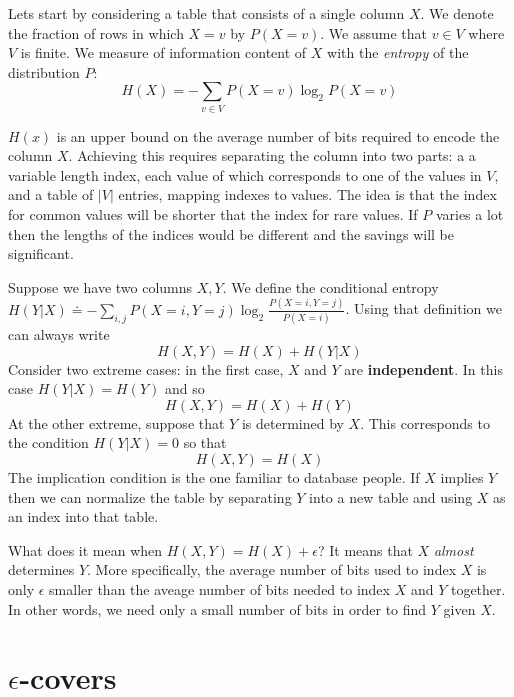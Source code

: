 \documentclass[11pt]{article}
\begin{document}
Lets start by considering a table that consists of a single column
$X$. We denote the fraction of rows in which $X=v$ by $P(X=v)$. We
assume that $v \in V$ where $V$ is finite.  We measure of information
content of $X$ with the {\em entropy} of the distribution $P$:
\[
H(X)=-\sum_{v \in V} P(X=v) \log_2 P(X=v)
\]

$H(x)$ is an upper bound on the average number of bits required to
encode the column $X$. Achieving this requires separating the column
into two parts: a a variable length index, each value of which
corresponds to one of the values in $V$, and a table of $|V|$ entries,
mapping indexes to values. The idea is that the index for common
values will be shorter that the index for rare values. If $P$ varies a
lot then the lengths of the indices would be different and the savings
will be significant.

Suppose we have two columns
$X,Y$. We define the conditional entropy $H(Y|X) \doteq -\sum_{i,j}
P(X=i,Y=j) \log_2  \frac{P(X=i,Y=j)}{P(X=i)}$. Using that definition we
can always write
\[
H(X,Y) = H(X)+H(Y|X)
\]
Consider two extreme cases: in the first case, $X$ and $Y$ are
{\bf independent}. In this case $H(Y|X)=H(Y)$ and so
\[
H(X,Y)=H(X)+H(Y)
\]
At the other extreme, suppose that $Y$ is determined by $X$. 
This corresponds to the condition $H(Y|X)=0$ so that
\[
H(X,Y)=H(X)
\]
The implication condition is the one familiar to database people. If
$X$ implies $Y$ then we can normalize the table by separating $Y$ into
a new table and using $X$ as an index into that table.

What does it mean when $H(X,Y)=H(X)+\epsilon$? It means that $X$ {\em
  almost} determines $Y$. More specifically, the average number of
bits used to index $X$ is only $\epsilon$ smaller than the aveage
number of bits needed to index $X$ and $Y$ together. In other words,
we need only a small number of bits in order to find $Y$ given $X$.

\section{$\epsilon$-covers}
\end{document}
